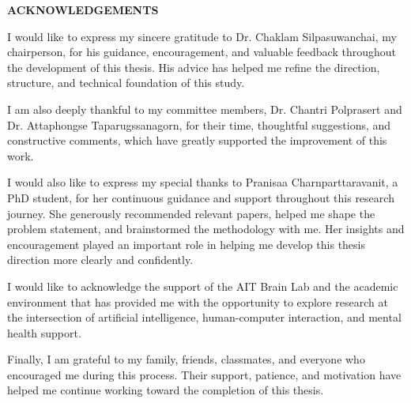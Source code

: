 {}
\begin{center}
    \large{\bf ACKNOWLEDGEMENTS}
\end{center}

I would like to express my sincere gratitude to Dr. Chaklam Silpasuwanchai, my chairperson, for his guidance, encouragement, and valuable feedback throughout the development of this thesis. His advice has helped me refine the direction, structure, and technical foundation of this study.

I am also deeply thankful to my committee members, Dr. Chantri Polprasert and Dr. Attaphongse Taparugssanagorn, for their time, thoughtful suggestions, and constructive comments, which have greatly supported the improvement of this work.

I would also like to express my special thanks to Pranisaa Charnparttaravanit, a PhD student, for her continuous guidance and support throughout this research journey. She generously recommended relevant papers, helped me shape the problem statement, and brainstormed the methodology with me. Her insights and encouragement played an important role in helping me develop this thesis direction more clearly and confidently.

I would like to acknowledge the support of the AIT Brain Lab and the academic environment that has provided me with the opportunity to explore research at the intersection of artificial intelligence, human-computer interaction, and mental health support.

Finally, I am grateful to my family, friends, classmates, and everyone who encouraged me during this process. Their support, patience, and motivation have helped me continue working toward the completion of this thesis.